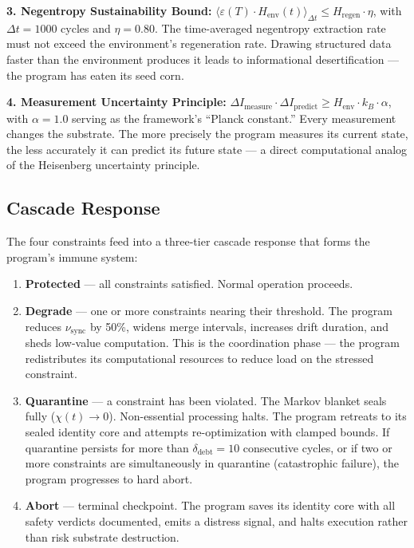 \documentclass[twocolumn, 10pt, journal, letterpaper]{IEEEtran}
\begin{document}
\textbf{3. Negentropy Sustainability Bound:} $\displaystyle \langle \varepsilon(T) \cdot H_{\text{env}}(t) \rangle_{\Delta t} \leq H_{\text{regen}} \cdot \eta$, with $\Delta t = 1000$ cycles and $\eta = 0.80$. The time-averaged negentropy extraction rate must not exceed the environment's regeneration rate. Drawing structured data faster than the environment produces it leads to informational desertification --- the program has eaten its seed corn.

\textbf{4. Measurement Uncertainty Principle:} $\displaystyle \Delta I_{\text{measure}} \cdot \Delta I_{\text{predict}} \geq H_{\text{env}} \cdot k_B \cdot \alpha$, with $\alpha = 1.0$ serving as the framework's ``Planck constant.'' Every measurement changes the substrate. The more precisely the program measures its current state, the less accurately it can predict its future state --- a direct computational analog of the Heisenberg uncertainty principle.

\subsection{Cascade Response}

The four constraints feed into a three-tier cascade response that forms the program's immune system:

\begin{enumerate}
    \item \textbf{Protected} --- all constraints satisfied. Normal operation proceeds.
    \item \textbf{Degrade} --- one or more constraints nearing their threshold. The program reduces $\nu_{\text{sync}}$ by 50\%, widens merge intervals, increases drift duration, and sheds low-value computation. This is the coordination phase --- the program redistributes its computational resources to reduce load on the stressed constraint.
    \item \textbf{Quarantine} --- a constraint has been violated. The Markov blanket seals fully ($\chi(t) \to 0$). Non-essential processing halts. The program retreats to its sealed identity core and attempts re-optimization with clamped bounds. If quarantine persists for more than $\delta_{\text{debt}} = 10$ consecutive cycles, or if two or more constraints are simultaneously in quarantine (catastrophic failure), the program progresses to hard abort.
    \item \textbf{Abort} --- terminal checkpoint. The program saves its identity core with all safety verdicts documented, emits a distress signal, and halts execution rather than risk substrate destruction.
\end{enumerate}
\end{document}
